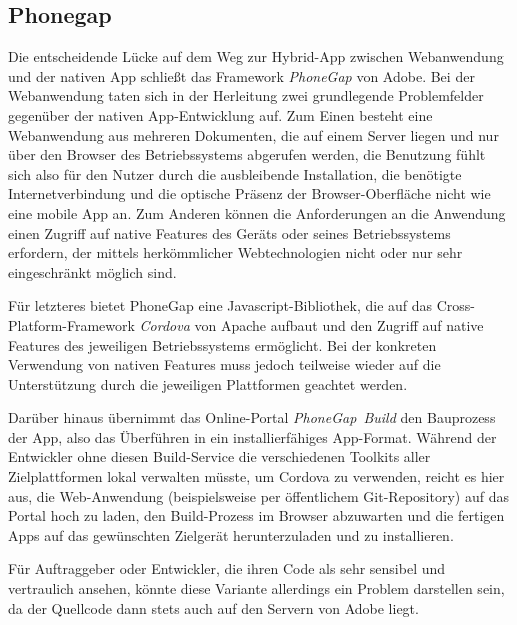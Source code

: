 \subsection{Phonegap}
Die entscheidende Lücke auf dem Weg zur Hybrid-App zwischen Webanwendung und der nativen App schließt das Framework \emph{PhoneGap} von Adobe. 
Bei der Webanwendung taten sich in der Herleitung zwei grundlegende Problemfelder gegenüber der nativen App-Entwicklung auf. 
Zum Einen besteht eine Webanwendung aus mehreren Dokumenten, die auf einem Server liegen und nur über den Browser des Betriebssystems abgerufen werden, die Benutzung fühlt sich also für den Nutzer durch die ausbleibende Installation, die benötigte Internetverbindung und die optische Präsenz der Browser-Oberfläche nicht wie eine mobile App an. 
Zum Anderen können die Anforderungen an die Anwendung einen Zugriff auf native Features des Geräts oder seines Betriebssystems erfordern, der mittels herkömmlicher Webtechnologien nicht oder nur sehr eingeschränkt möglich sind. 

Für letzteres bietet PhoneGap eine Javascript-Bibliothek, die auf das Cross-Platform-Framework \emph{Cordova} von Apache aufbaut und den Zugriff auf native Features des jeweiligen Betriebssystems ermöglicht.
Bei der konkreten Verwendung von nativen Features muss jedoch teilweise wieder auf die Unterstützung durch die jeweiligen Plattformen geachtet werden.

Darüber hinaus übernimmt das Online-Portal \emph{PhoneGap~Build} den Bauprozess der App, also das Überführen in ein installierfähiges App-Format. 
Während der Entwickler ohne diesen Build-Service die verschiedenen Toolkits aller Zielplattformen lokal verwalten müsste, um Cordova zu verwenden,\cite{pg-doc-1} reicht es hier aus, die Web-Anwendung (beispielsweise per öffentlichem Git-Repository) auf das Portal hoch zu laden, den Build-Prozess im Browser abzuwarten und die fertigen Apps auf das gewünschten Zielgerät herunterzuladen und zu installieren. 

Für Auftraggeber oder Entwickler, die ihren Code als sehr sensibel und vertraulich ansehen, könnte diese Variante allerdings ein Problem darstellen sein, da der Quellcode dann stets auch auf den Servern von Adobe liegt.

